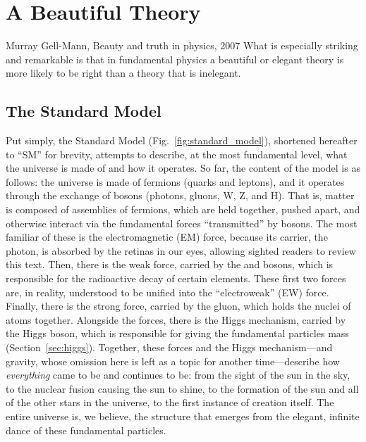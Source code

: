 \chapter{A Beautiful Theory}
\begin{aquote}{Murray Gell-Mann, Beauty and truth in physics, 2007}
    What is especially striking and remarkable is that in fundamental physics 
    a beautiful or elegant theory is more likely to be right 
    than a theory that is inelegant.
\end{aquote}

\section{The Standard Model}
Put simply, the Standard Model (Fig.~\ref{fig:standard_model}), shortened hereafter to ``SM'' for brevity, attempts to describe, at the most fundamental level, what the universe is made of and how it operates. 
So far, the content of the model is as follows: the universe is made of fermions (quarks and leptons), and it operates through the exchange of bosons (photons, gluons, W, Z, and H). 
That is, matter\footnotemark{} is composed of assemblies of fermions, which are held together, pushed apart, and otherwise interact via the fundamental forces ``transmitted'' by bosons. 
The most familiar of these is the electromagnetic (EM) force, because its carrier, the photon, is absorbed by the retinas in our eyes, allowing sighted readers to review this text. 
Then, there is the weak force, carried by the \PW and \PZ bosons, which is responsible for the radioactive decay of certain elements. 
These first two forces are, in reality, understood to be unified into the ``electroweak'' (EW) force. 
Finally, there is the strong force, carried by the gluon, which holds the nuclei of atoms together. 
Alongside the forces, there is the Higgs mechanism, carried by the Higgs boson, which is responsible for giving the fundamental particles mass (Section~\ref{sec:higgs}). 
Together, these forces and the Higgs mechanism---and gravity, whose omission here is left as a topic for another time---describe how \textit{everything} came to be and continues to be: from the sight of the sun in the sky, to the nuclear fusion causing the sun to shine, to the formation of the sun and all of the other stars in the universe, to the first instance of creation itself. 
The entire universe is, we believe, the structure that emerges from the elegant, infinite dance of these fundamental particles. 

